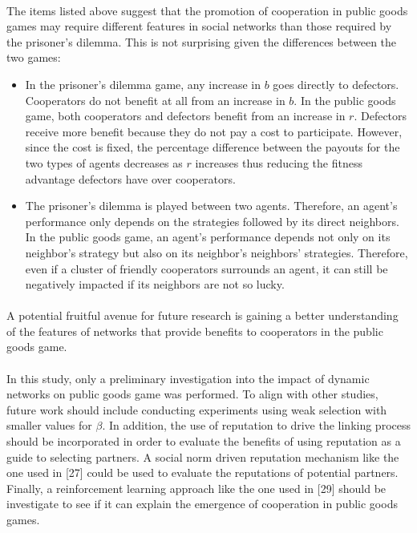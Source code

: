 \documentclass{article}
\begin{document}
	\paragraph{}The items listed above suggest that the promotion of cooperation in public goods games may require different features in social networks than those required by the prisoner's dilemma.  This is not surprising given the differences between the two games:

	\begin{itemize}
		\item In the prisoner's dilemma game, any increase in $b$ goes directly to defectors.  Cooperators do not benefit at all from an increase in $b$.  In the public goods game, both cooperators and defectors benefit from an increase in $r$.  Defectors receive more benefit because they do not pay a cost to participate.  However, since the cost is fixed, the percentage difference between the payouts for the two types of agents decreases as $r$ increases thus reducing the fitness advantage defectors have over cooperators.
		\item The prisoner's dilemma is played between two agents.  Therefore, an agent's performance only depends on the strategies followed by its direct neighbors.  In the public goods game, an agent's performance depends not only on its neighbor's strategy but also on its neighbor's neighbors' strategies.  Therefore, even if a cluster of friendly cooperators surrounds an agent, it can still be negatively impacted if its neighbors are not so lucky.
	\end{itemize}

	\paragraph{} A potential fruitful avenue for future research is gaining a better understanding of the features of networks that provide benefits to cooperators in the public goods game.
	\paragraph{}In this study, only a preliminary investigation into the impact of dynamic networks on public goods game was performed.  To align with other studies, future work should include conducting experiments using weak selection with smaller values for $\beta$.  In addition, the use of reputation to drive the linking process should be incorporated in order to evaluate the benefits of using reputation as a guide to selecting partners.  A social norm driven reputation mechanism like the one used in [27] could be used to evaluate the reputations of potential partners.  Finally, a reinforcement learning approach like the one used in [29] should be investigate to see if it can explain the emergence of cooperation in public goods games.

    
    
\end{document}
